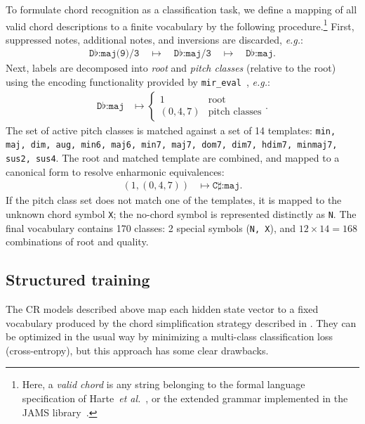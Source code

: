 \documentclass{article}
\def\eg{\emph{e.g.}}
\begin{document}
To formulate chord recognition as a classification task, we define a mapping of all valid chord descriptions to a finite vocabulary by the following procedure.\footnote{Here, a \emph{valid chord} is any string belonging to the formal language specification of Harte~\emph{et al.}~\cite{harte2005symbolic}, or the extended grammar implemented in the JAMS library~\cite{humphrey2014jams}.}
First, suppressed notes, additional notes, and inversions are discarded, \eg:
\begin{align*}
    \texttt{D}\flat\texttt{:maj(9)/3} 
    \quad\mapsto\quad \texttt{D}\flat\texttt{:maj/3}
    \quad\mapsto\quad \texttt{D}\flat\texttt{:maj}.
\end{align*}
Next, labels are decomposed into \emph{root} and \emph{pitch classes} (relative to the root) using the encoding functionality provided by \texttt{mir\_eval}~\cite{raffel2014mir_eval}, \eg:
\begin{align*}
    \texttt{D}\flat\texttt{:maj} &\mapsto \begin{cases}
        1 & \text{root}\\
        (0, 4, 7) & \text{pitch classes}
    \end{cases}.
\end{align*}
The set of active pitch classes is matched against a set of 14 templates: \texttt{min, maj, dim, aug, min6, maj6, min7, maj7, dom7, dim7, hdim7, minmaj7, sus2, sus4}.
The root and matched template are combined, and mapped to a canonical form to resolve enharmonic equivalences:
\begin{align*}
    \left(1, (0, 4, 7) \right) &\mapsto \texttt{C}\sharp\texttt{:maj}.
\end{align*}
If the pitch class set does not match one of the templates, it is mapped to the unknown chord symbol \texttt{X}; the no-chord symbol is represented distinctly as \texttt{N}.
The final vocabulary contains 170 classes: 2 special symbols (\texttt{N, X}), and $12\times14=168$ combinations of root and quality.


\subsection{Structured training}
\label{sec:encoding}

The CR models described above map each hidden state vector to a fixed vocabulary produced by the chord simplification strategy described in .
They can be optimized in the usual way by minimizing a multi-class classification loss (cross-entropy), but this approach has some clear drawbacks.
\end{document}
